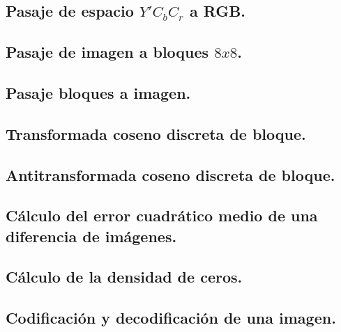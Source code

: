 \documentclass[%
final,
%
reprint,
%
notitlepage,
narroweqnarray,
inline,
twoside,
invited
]{ieee}
\begin{document}

\subsection{Pasaje de espacio $Y'C_bC_r$ a RGB. }


\subsection{Pasaje de imagen a bloques $8x8$. }


\subsection{Pasaje bloques a imagen. }


\subsection{Transformada coseno discreta de bloque. }


\subsection{Antitransformada coseno discreta de bloque. }


\subsection{Cálculo del error cuadrático medio de una diferencia de imágenes. }


\subsection{Cálculo de la densidad de ceros. }


\subsection{Codificación y decodificación de una imagen.}

\end{document}
